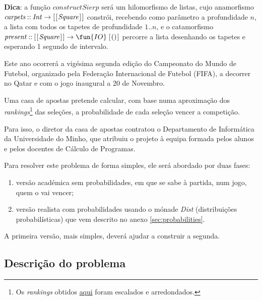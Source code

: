 \documentclass[a4paper]{article}
\newcommand{\Conid}[1]{\mathit{#1}}
\newcommand{\Varid}[1]{\mathit{#1}}
\def\resethooks{%
  \global\let\SaveRestoreHook\empty
  \global\let\ColumnHook\empty}
\begin{document}
\begin{enumerate}
\begin{hscode}
\>[B]{}\Varid{constructSierp}\mathrel{=}\Varid{present}\comp \Varid{carpets}{}\<[E]%
\ColumnHook
\end{hscode}\resethooks
\textbf{Dica}: a função \ensuremath{\Varid{constructSierp}} será um hilomorfismo de listas, cujo anamorfismo \ensuremath{\Varid{carpets}\mathbin{::}\Conid{Int}\to [\mskip1.5mu [\mskip1.5mu \Conid{Square}\mskip1.5mu]\mskip1.5mu]} constrói, recebendo como parâmetro a profundidade $n$, a lista com todos os tapetes de profundidade $1..n$, e o catamorfismo \ensuremath{\Varid{present}\mathbin{::}[\mskip1.5mu [\mskip1.5mu \Conid{Square}\mskip1.5mu]\mskip1.5mu]\to \fun{IO}\;[\mskip1.5mu ()\mskip1.5mu]} percorre a lista desenhando os tapetes e esperando 1 segundo de intervalo.
\end{enumerate}

\Problema

Este ano ocorrerá a vigésima segunda edição do Campeonato do Mundo de Futebol, organizado pela Federação Internacional de Futebol (FIFA), a decorrer no Qatar e com o jogo inaugural a 20 de Novembro.

Uma casa de apostas pretende calcular, com base numa aproximação dos \textit{rankings}\footnote{Os \textit{rankings} obtidos \href{https://www.fifa.com/fifa-world-ranking/men?dateId=id13687}{aqui} foram escalados e arredondados.} das seleções, a probabilidade de cada seleção vencer a competição.

Para isso, o diretor da casa de apostas contratou o Departamento de Informática da Universidade do Minho, que atribuiu o projeto à equipa formada pelos alunos e pelos docentes de Cálculo de Programas.

\begin{alert}
Para resolver este problema de forma simples, ele será abordado por duas fases:
\begin{enumerate}
\item versão académica sem probabilidades, em que se sabe à partida, num jogo, quem o vai vencer;
\item versão realista com probabilidades usando o mónade \textit{Dist} (distribuições probabilísticas) que vem descrito no anexo \ref{sec:probabilities}.
\end{enumerate}
A primeira versão, mais simples, deverá ajudar a construir a segunda.
\end{alert}

\subsection*{Descrição do problema}
\end{document}

